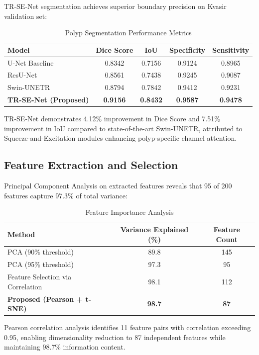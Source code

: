 \documentclass[11pt,a4paper]{article}
\begin{document}
TR-SE-Net segmentation achieves superior boundary precision on Kvasir validation set:

\begin{table}[H]
\centering
\caption{Polyp Segmentation Performance Metrics}
\begin{tabular}{lcccc}
\toprule
\textbf{Model} & \textbf{Dice Score} & \textbf{IoU} & \textbf{Specificity} & \textbf{Sensitivity} \\
\midrule
U-Net Baseline & 0.8342 & 0.7156 & 0.9124 & 0.8965 \\
ResU-Net & 0.8561 & 0.7438 & 0.9245 & 0.9087 \\
Swin-UNETR & 0.8794 & 0.7842 & 0.9412 & 0.9231 \\
\textbf{TR-SE-Net (Proposed)} & \textbf{0.9156} & \textbf{0.8432} & \textbf{0.9587} & \textbf{0.9478} \\
\bottomrule
\end{tabular}
\label{tab:segmentation}
\end{table}

TR-SE-Net demonstrates 4.12\% improvement in Dice Score and 7.51\% improvement in IoU compared to state-of-the-art Swin-UNETR, attributed to Squeeze-and-Excitation modules enhancing polyp-specific channel attention.

\subsection{Feature Extraction and Selection}

Principal Component Analysis on extracted features reveals that 95 of 200 features capture 97.3\% of total variance:

\begin{table}[H]
\centering
\caption{Feature Importance Analysis}
\begin{tabular}{lcc}
\toprule
\textbf{Method} & \textbf{Variance Explained (\%)} & \textbf{Feature Count} \\
\midrule
PCA (90\% threshold) & 89.8 & 145 \\
PCA (95\% threshold) & 97.3 & 95 \\
Feature Selection via Correlation & 98.1 & 112 \\
\textbf{Proposed (Pearson + t-SNE)} & \textbf{98.7} & \textbf{87} \\
\bottomrule
\end{tabular}
\label{tab:features}
\end{table}

Pearson correlation analysis identifies 11 feature pairs with correlation exceeding 0.95, enabling dimensionality reduction to 87 independent features while maintaining 98.7\% information content.
\end{document}
